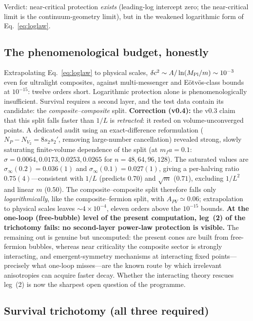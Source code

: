 \documentclass[11pt,a4paper]{article}
\begin{document}
Verdict: near-critical protection \emph{exists} (leading-log
intercept zero; the near-critical limit is the continuum-geometry
limit), but in the weakened logarithmic form of
Eq.~\eqref{eq:loglaw}.

\subsection{The phenomenological budget, honestly}

Extrapolating Eq.~\eqref{eq:loglaw} to physical scales,
$\delta c^2 \sim A/\ln(M_{\rm Pl}/m) \sim 10^{-3}$ even for
ultralight composites, against multi-messenger and
E\"otv\"os-class bounds at $10^{-15}$: twelve orders short.
Logarithmic protection alone is phenomenologically insufficient.
Survival requires a second layer, and the test data contain its
candidate: the \emph{composite--composite} split.
\textbf{Correction (v0.4):} the v0.3 claim that this split falls
faster than $1/L$ is \emph{retracted}: it rested on
volume-unconverged points.  A dedicated audit using an
exact-difference reformulation ($N_P - N_{V_2} = 8 s_2 s_2'$,
removing large-number cancellation) revealed strong, slowly
saturating finite-volume dependence of the split
(at $m_f a = 0.1$: $\sigma = 0.0064, 0.0173, 0.0253, 0.0265$
for $n = 48, 64, 96, 128$).  The saturated values are
$\sigma_\infty(0.2) = 0.036(1)$ and
$\sigma_\infty(0.1) = 0.027(1)$, giving a per-halving ratio
$0.75(4)$---consistent with $1/L$ (predicts $0.70$) and
$\sqrt{m}$ ($0.71$), excluding $1/L^2$ and linear $m$ ($0.50$).
The composite--composite split therefore falls only
\emph{logarithmically}, like the composite--fermion split, with
$A_{PV} \simeq 0.06$; extrapolation to physical scales leaves
$\sim 4\times10^{-4}$, eleven orders above the $10^{-15}$
bounds.  \textbf{At the one-loop (free-bubble) level of the
present computation, leg~(2) of the trichotomy fails: no
second-layer power-law protection is visible.}
The remaining out is genuine but uncomputed: the present cones
are built from free-fermion bubbles, whereas near criticality the
composite sector is strongly interacting, and emergent-symmetry
mechanisms at interacting fixed points---precisely what one-loop
misses---are the known route by which irrelevant anisotropies can
acquire faster decay.  Whether the interacting theory rescues
leg~(2) is now the sharpest open question of the programme.

\subsection{Survival trichotomy (all three required)}
\end{document}
